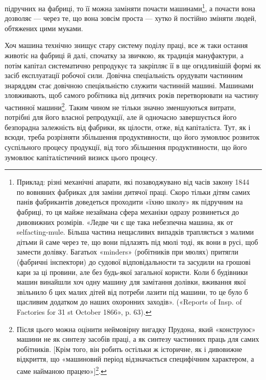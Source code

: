 \parcont{}  %
підручних на фабриці, то її можна заміняти почасти машинами\footnote{
Приклад: різні механічні апарати, які позаводжувано від часів
закону 1844~ по вовняних фабриках для заміни дитячої праці. Скоро
тільки дітям самих панів фабрикантів доведеться проходити «їхню школу»
як підручним на фабриці, то ця майже незаймана сфера механіки одразу
розвинеться до дивовижних розмірів. «Ледве чи є ще така небезпечна
машина, як от selfacting-mule. Більша частина нещасливих випадків
трапляється з малими дітьми й саме через те, що вони підлазять під мюлі
тоді, як вони в русі, щоб замести долівку. Багатьох «minders» (робітників
при мюлях) притягли (фабричні інспектори) до судової відповідальности
та засудили на грошові кари за ці провини, але без будь-якої загальної
користи. Коли б будівники машин винайшли хоч одну машину
для замітання долівки, вживання якої звільнило б цих малих дітей від
потреби лазити під машини, то це було б щасливим додатком до наших
охоронних заходів». («Reports of Insp. of Factories for 31 st October
1866», p. 63).
},
а почасти вона дозволяє — через те, що вона зовсім проста —
хутко й постійно зміняти людей, обтяжених цими муками.

Хоч машина технічно знищує стару систему поділу праці,
все ж таки остання животіє на фабриці й далі, спочатку за звичкою,
як традиція мануфактури, а потім капітал систематично
репродукує та закріпляє її в ще огидливішій формі як засіб
експлуатації робочої сили. Довічна спеціальність орудувати
частинним знаряддям стає довічною спеціяльністю служити частинній
машині. Машинами зловживають, щоб самого робітника
від дитячих років перетворювати на частину частинної машини\footnote{
Після цього можна оцінити неймовірну вигадку Прудона, який
«конструює» машини не як синтезу засобів праці, а як синтезу частинних
праць для самих робітників. [Крім того, він робить остільки ж історичне,
як і дивовижне відкриття, що «машиновий період відзначається специфічним
характером, а саме найманою працею»]\footnote*{
Подане у прямих дужках ми беремо з французького видання. \emph{Ред.}
}.
}.
Таким чином не тільки значно зменшуються витрати, потрібні
для його власної репродукції, але й одночасно завершується його
безпорадна залежність від фабрики, як цілости, отже, від капіталіста.
Тут, як і всюди, треба розрізняти збільшення продуктивности,
що його зумовлює розвиток суспільного процесу продукції,
від того збільшення продуктивности, що його зумовлює
капіталістичний визиск цього процесу.

